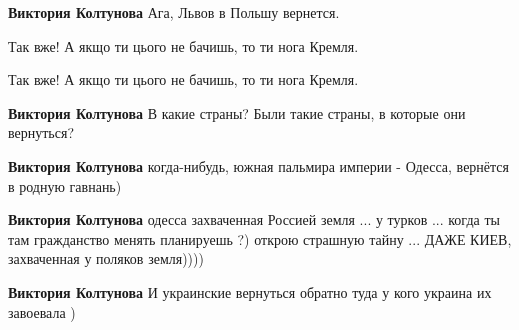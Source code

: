 \begin{itemize}
\begin{itemize}
\textbf{Виктория Колтунова} Ага, Львов в Польшу вернется.

 
Так вже!
А якщо ти цього не бачишь, то ти нога Кремля.

 
Так вже!
А якщо ти цього не бачишь, то ти нога Кремля.

 
\textbf{Виктория Колтунова} В какие страны? Были такие страны, в которые они вернуться?

 
\textbf{Виктория Колтунова} когда-нибудь, южная пальмира империи - Одесса, вернётся в родную гавнань)

 
\textbf{Виктория Колтунова} одесса захваченная Россией земля ... у турков ... когда ты там гражданство менять планируешь ?)
открою страшную тайну ... ДАЖЕ КИЕВ, захваченная у поляков земля))))

 
\textbf{Виктория Колтунова} И украинские вернуться обратно туда у кого украина их завоевала )

 

\end{itemize}
\end{itemize}
